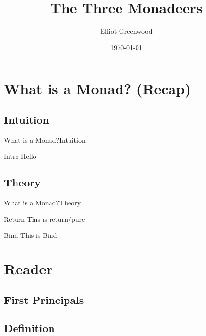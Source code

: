 \documentclass{beamer}
\begin{document}
\title{The Three Monadeers}
\author{Elliot Greenwood}
\date{\today}
  \begin{frame}
    \titlepage%
  \end{frame}
  \begin{frame}
    \begin{multicols}{2}
      \tableofcontents
    \end{multicols}
  \end{frame}
  \section{What is a Monad? (Recap)}
  \subsection{Intuition}
  \begin{frame}{What is a Monad?}{Intuition}
    \begin{block}{Intro}
      Hello
    \end{block}
  \end{frame}
  \subsection{Theory}
  \begin{frame}{What is a Monad?}{Theory}
    \begin{block}{Return}
      This is return/pure
    \end{block}
    \begin{block}{Bind}
      This is Bind
    \end{block}
  \end{frame}

  \section{Reader}
  \subsection{First Principals}
  \begin{frame}
    
  \end{frame}
  \subsection{Definition}
  \begin{frame}
    
  \end{frame}
\end{document}
